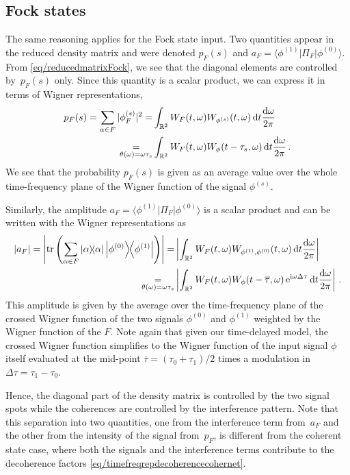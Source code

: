 \subsection{Fock states}

The same reasoning applies for the Fock state input.
Two quantities appear in the reduced density matrix and were denoted
$p_F(s)$ and $a_F = \langle \phi^{(1)}|\Pi_F|\phi^{(0)}\rangle$. From 
\cref{eq/reducedmatrixFock}, we see that the diagonal elements are
controlled by~$p_F(s)$ only. Since this quantity is a scalar product, we can
express it in terms of Wigner representations,
%
\begin{align}
p_F(s) = \sum_{\alpha \in F} |\phi_F^{(s)}|^2
= &\int_{\mathbb{R}^2} W_F(t,\omega)W_{\phi^{(s)}}(t,\omega)
\, \mathrm{d} t \frac{\mathrm{d}\omega}{2\pi} \\
\underset{\theta(\omega)=\omega\tau_s}{=}
&\int_{\mathbb{R}^2} W_F(t,\omega)W_{\phi}(t-\tau_s,\omega)
\, \mathrm{d} t \frac{\mathrm{d}\omega}{2\pi}
\,.
\label{eq/timefreq-pf}
\end{align}
We see that the probability $p_F(s)$ is given as an average
value over the whole time-frequency plane of the Wigner function of 
the signal $\phi^{(s)}$.

Similarly, the amplitude $a_F = \langle \phi^{(1)}|\Pi_F|\phi^{(0)}\rangle$
is a scalar product and can be written with the Wigner representations as
%
\begin{align}
|a_F|=\left|\trace\left(\sum_{\alpha\in F} \ketbra{\alpha} 
	\ketbra{\phi^{(0)}}{\phi^{(1)}}\right)\right|
=&\left| \int_{\mathbb{R}^2} 
	W_F(t,\omega)W_{\phi^{(1)},\phi^{(0)}}(t,\omega)
\, \md t \frac{\md\omega}{2\pi}\right| \\
\underset{\theta(\omega)=\omega\tau_s}{=}
&\left| \int_{\mathbb{R}^2} 
	W_F(t,\omega)W_{\phi}(t-\overline{\tau},\omega) \,\me^{\mi\omega\Delta\tau}
\, \md t \frac{\md\omega}{2\pi}\right| \,.
\label{eq/timefreq-af}
\end{align}
This amplitude is given by the average over
the time-frequency plane of the crossed Wigner function of the 
two signals $\phi^{(0)}$ and $\phi^{(1)}$ weighted by the Wigner function
of the $F$. Note again that given our time-delayed model, the crossed 
Wigner function simplifies to the Wigner function of the input signal 
$\phi$ itself evaluated at the mid-point $\overline{\tau} = (\tau_0
+\tau_1)/2$ times a modulation in $\Delta \tau = \tau_1-\tau_0$.

Hence, the diagonal part of the density matrix is controlled 
by the two signal spots while the coherences are controlled 
by the interference pattern. Note that this separation into two
quantities, one from the interference term from~$a_F$ and the other
from the intensity of the signal from~$p_F$, is different from
the coherent state case, where both the signals and the interference
terms contribute to the decoherence factors 
\cref{eq/timefreqrepdecoherencecohernet}.


